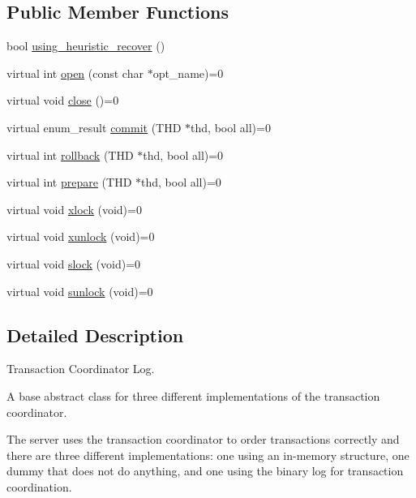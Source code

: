 \subsection*{Public Member Functions}
\begin{DoxyCompactItemize}
\item 
bool \mbox{\hyperlink{classTC__LOG_a57d3ed9dfb015fb2427a25eecaf78687}{using\+\_\+heuristic\+\_\+recover}} ()
\item 
virtual int \mbox{\hyperlink{classTC__LOG_a34eb4c35fe8d29b0febbd700a61b282d}{open}} (const char $\ast$opt\+\_\+name)=0
\item 
virtual void \mbox{\hyperlink{classTC__LOG_a645b5d1b49c4c4396d327eef07e2dd53}{close}} ()=0
\item 
virtual enum\+\_\+result \mbox{\hyperlink{classTC__LOG_a3f9ef43db745a798f8b361eb0b93ff22}{commit}} (T\+HD $\ast$thd, bool all)=0
\item 
virtual int \mbox{\hyperlink{classTC__LOG_abf637f1bbf02c6f8e4f69aa2f5e2d362}{rollback}} (T\+HD $\ast$thd, bool all)=0
\item 
virtual int \mbox{\hyperlink{classTC__LOG_ab968f1e200f370127c3dcd0302d00968}{prepare}} (T\+HD $\ast$thd, bool all)=0
\item 
virtual void \mbox{\hyperlink{classTC__LOG_aac75dc061e9aae27449e675b23c27ae3}{xlock}} (void)=0
\item 
virtual void \mbox{\hyperlink{classTC__LOG_a60ee380273adc9e23c56ff114cd2636a}{xunlock}} (void)=0
\item 
virtual void \mbox{\hyperlink{classTC__LOG_a5b73af1ad12c691b3417c565f7e58a1c}{slock}} (void)=0
\item 
virtual void \mbox{\hyperlink{classTC__LOG_ab383cdb4b722c9b11d284ac8b970b087}{sunlock}} (void)=0
\end{DoxyCompactItemize}


\subsection{Detailed Description}
Transaction Coordinator Log.

A base abstract class for three different implementations of the transaction coordinator.

The server uses the transaction coordinator to order transactions correctly and there are three different implementations\+: one using an in-\/memory structure, one dummy that does not do anything, and one using the binary log for transaction coordination. 

